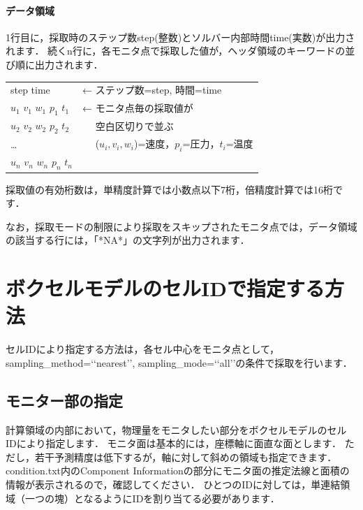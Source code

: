 \paragraph{データ領域}
1行目に，採取時のステップ数step(整数)とソルバー内部時間time(実数)が出力されます．
続くn行に，各モニタ点で採取した値が，ヘッダ領域のキーワードの並び順に出力されます．
\begin{center}
\vspace{0.2\baselineskip}
\begin{tabular}{|p{14em}|p{20em}}\cline{1-1}
step time  & ← ステップ数=step, 時間=time\\ 
$u_1$  $v_1$  $w_1$ $p_1$ $t_1$  & ← モニタ点毎の採取値が\\
$u_2$  $v_2$  $w_2$ $p_2$ $t_2$  & 　 空白区切りで並ぶ\\
  …                             & 　 ($u_i,v_i,w_i$)=速度，$p_i$=圧力，$t_i$=温度\\
$u_n$ $v_n$ $w_n$ $p_n$ $t_n$  & \\
\cline{1-1}
\end{tabular}
\vspace{0.2\baselineskip}
\end{center}

採取値の有効桁数は，単精度計算では小数点以下7桁，倍精度計算では16桁です．

なお，採取モードの制限により採取をスキップされたモニタ点では，データ領域の該当する行には，「*NA*」の文字列が出力されます．


\pagebreak
\hypertarget{tgt:cell_monitor}{\section{ボクセルモデルのセルIDで指定する方法}}
セルIDにより指定する方法は，各セル中心をモニタ点として，
sampling\_method=\lq\lq nearest\rq\rq , sampling\_mode=\lq\lq all\rq\rq の条件で採取を行います．

%
\subsection{モニター部の指定}
計算領域の内部において，物理量をモニタしたい部分をボクセルモデルのセルIDにより指定します．
モニタ面は基本的には，座標軸に面直な面とします．
ただし，若干予測精度は低下するが，軸に対して斜めの領域も指定できます．
condition.txt内のComponent Informationの部分にモニタ面の推定法線と面積の情報が表示されるので，確認してください．
ひとつのIDに対しては，単連結領域（一つの塊）となるようにIDを割り当てる必要があります．

